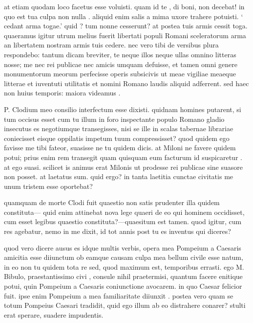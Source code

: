  at etiam quodam loco facetus esse voluisti. quam id te , di boni, non decebat! in quo est tua culpa non nulla . aliquid enim salis a mima uxore trahere potuisti. ` cedant arma togae.' quid ? tum nonne cesserunt? at postea tuis armis cessit toga. quaeramus igitur utrum melius fuerit libertati populi Romani sceleratorum arma an libertatem nostram armis tuis cedere. nec vero tibi de versibus plura respondebo: tantum dicam breviter, te neque illos neque ullas omnino litteras nosse; me nec rei publicae nec amicis umquam defuisse, et tamen omni genere monumentorum meorum perfecisse operis subsicivis ut meae vigiliae meaeque litterae et iuventuti utilitatis et nomini Romano laudis aliquid adferrent. sed haec non huius temporis: maiora videamus .

 P. Clodium meo consilio interfectum esse dixisti. quidnam homines putarent, si tum occisus esset cum tu illum in foro inspectante populo Romano gladio insecutus es negotiumque transegisses, nisi se ille in scalas tabernae librariae coniecisset eisque oppilatis impetum tuum compressisset? quod quidem ego favisse me tibi fateor, suasisse ne tu quidem dicis. at Miloni ne favere quidem potui; prius enim rem transegit quam quisquam eum facturum id suspicaretur . at ego suasi. scilicet is animus erat Milonis ut prodesse rei publicae sine suasore non posset. at laetatus sum. quid ergo? in tanta laetitia cunctae civitatis me unum tristem esse oportebat?

 quamquam de morte Clodi fuit quaestio non satis prudenter illa quidem constituta— quid enim attinebat nova lege quaeri de eo qui hominem occidisset, cum esset legibus quaestio constituta?—quaesitum est tamen. quod igitur, cum res agebatur, nemo in me dixit, id tot annis post tu es inventus qui diceres?

 quod vero dicere ausus es idque multis verbis, opera mea Pompeium a Caesaris amicitia esse diiunctum ob eamque causam culpa mea bellum civile esse natum, in eo non tu quidem tota re sed, quod maximum est, temporibus errasti. ego M. Bibulo, praestantissimo civi , consule nihil praetermisi, quantum facere enitique potui, quin Pompeium a Caesaris coniunctione avocarem. in quo Caesar felicior fuit. ipse enim Pompeium a mea familiaritate diiunxit . postea vero quam se totum Pompeius Caesari tradidit, quid ego illum ab eo distrahere conarer? stulti erat sperare, suadere impudentis.

